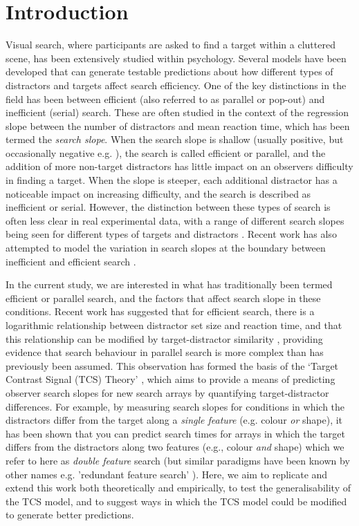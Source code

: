 \documentclass[preprint,12pt,authoryear]{elsarticle}
\begin{document}
\linenumbers

\section{Introduction}
\label{intro}

Visual search, where participants are asked to find a target within a cluttered scene, has been extensively studied within psychology. Several models have been developed that can generate testable predictions about how different types of distractors and targets affect search efficiency. One of the key distinctions in the field has been between efficient (also referred to as parallel or pop-out) and inefficient (serial) search. These are often studied in the context of the regression slope between the number of distractors and mean reaction time, which has been termed the \textit{search slope}. When the search slope is shallow (usually positive, but occasionally negative e.g. \citep{rangelov2017failure}), the search is called efficient or parallel, and the addition of more non-target distractors has little impact on an observers difficulty in finding a target. When the slope is steeper, each additional distractor has a noticeable impact on increasing difficulty, and the search is described as inefficient or serial. However, the distinction between these types of search is often less clear in real experimental data, with a range of different search slopes being seen for different types of targets and distractors \citep{duncan1989visual,cave1990modeling,wolfe1998can,liesefeld2016search}. Recent work has also attempted to model the variation in search slopes at the boundary between inefficient and efficient search \citep{liesefeld2016search}.

In the current study, we are interested in what has traditionally been termed efficient or parallel search, and the factors that affect search slope in these conditions. Recent work has suggested that for efficient search, there is a logarithmic relationship between distractor set size and reaction time, and that this relationship can be modified by target-distractor similarity \citep{buetti2016towards}, providing evidence that search behaviour in parallel search is more complex than has previously been assumed. This observation has formed the basis of the `Target Contrast Signal (TCS) Theory' \citep{lleras2020target}, which aims to provide a means of predicting observer search slopes for new search arrays by quantifying target-distractor differences. For example, by measuring search slopes for conditions in which the distractors differ from the target along a \textit{single feature} (e.g. colour \textit{or} shape), it has been shown that you can predict search times for arrays in which the target differs from the distractors along two features (e.g., colour \textit{and} shape) which we refer to here as \textit{double feature} search \citep{buetti2019predicting} (but similar paradigms have been known by other names e.g. 'redundant feature search' \citep{krummenacher2012dynamic, mordkoff1991interactive}). Here, we aim to replicate and extend this work both theoretically and empirically, to test the generalisability of the TCS model, and to suggest ways in which the TCS model could be modified to generate better predictions.
\end{document}
